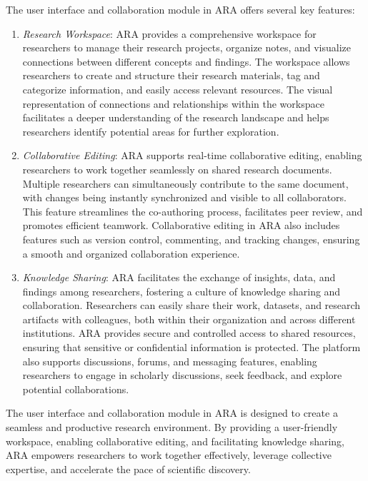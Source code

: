 \documentclass[a4paper,conference]{IEEEtran}
\begin{document}
The user interface and collaboration module in ARA offers several key features:

\begin{enumerate}
\item \textit{Research Workspace}: ARA provides a comprehensive workspace for researchers to manage their research projects, organize notes, and visualize connections between different concepts and findings. The workspace allows researchers to create and structure their research materials, tag and categorize information, and easily access relevant resources. The visual representation of connections and relationships within the workspace facilitates a deeper understanding of the research landscape and helps researchers identify potential areas for further exploration.

\item \textit{Collaborative Editing}: ARA supports real-time collaborative editing, enabling researchers to work together seamlessly on shared research documents. Multiple researchers can simultaneously contribute to the same document, with changes being instantly synchronized and visible to all collaborators. This feature streamlines the co-authoring process, facilitates peer review, and promotes efficient teamwork. Collaborative editing in ARA also includes features such as version control, commenting, and tracking changes, ensuring a smooth and organized collaboration experience.

\item \textit{Knowledge Sharing}: ARA facilitates the exchange of insights, data, and findings among researchers, fostering a culture of knowledge sharing and collaboration. Researchers can easily share their work, datasets, and research artifacts with colleagues, both within their organization and across different institutions. ARA provides secure and controlled access to shared resources, ensuring that sensitive or confidential information is protected. The platform also supports discussions, forums, and messaging features, enabling researchers to engage in scholarly discussions, seek feedback, and explore potential collaborations.
\end{enumerate}

The user interface and collaboration module in ARA is designed to create a seamless and productive research environment. By providing a user-friendly workspace, enabling collaborative editing, and facilitating knowledge sharing, ARA empowers researchers to work together effectively, leverage collective expertise, and accelerate the pace of scientific discovery.
\end{document}
